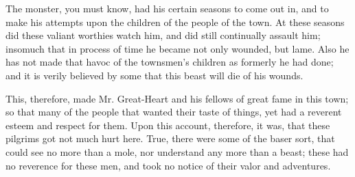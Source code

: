 The monster, you must know, had his certain seasons to come out in, and to make his attempts upon the children of the people of the town. At these seasons did these valiant worthies watch him, and did still continually assault him; insomuch that in process of time he became not only wounded, but lame. Also he has not made that havoc of the townsmen's children as formerly he had done; and it is verily believed by some that this beast will die of his wounds.

This, therefore, made Mr. Great-Heart and his fellows of great fame in this town; so that many of the people that wanted their taste of things, yet had a reverent esteem and respect for them. Upon this account, therefore, it was, that these pilgrims got not much hurt here. True, there were some of the baser sort, that could see no more than a mole, nor understand any more than a beast; these had no reverence for these men, and took no notice of their valor and adventures. 
